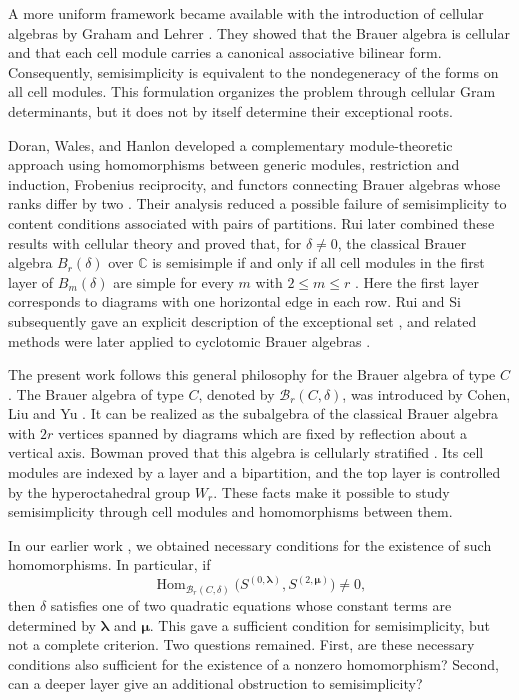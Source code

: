 \documentclass[10pt,a4paper]{amsart}
\DeclareMathOperator {\Hom}{Hom}
\newcommand{\C}{\mathbb{C}}
\newcommand{\1}{\mathfrak{1}}
\newcommand{\B}{\mathcal{B}}
\begin{document}
A more uniform framework became available with the introduction of cellular algebras by Graham and Lehrer \cite{GL96}. They showed that the Brauer algebra is cellular and that each cell module carries a canonical associative bilinear form. Consequently, semisimplicity is equivalent to the nondegeneracy of the forms on all cell modules. This formulation organizes the problem through cellular Gram determinants, but it does not by itself determine their exceptional roots.

Doran, Wales, and Hanlon developed a complementary module-theoretic approach using homomorphisms between generic modules, restriction and induction, Frobenius reciprocity, and functors connecting Brauer algebras whose ranks differ by two \cite{DWH99}. Their analysis reduced a possible failure of semisimplicity to content conditions associated with pairs of partitions. Rui later combined these results with cellular theory and proved that, for $\delta\neq0$, the classical Brauer algebra $B_r(\delta)$ over $\C$ is semisimple if and only if all cell modules in the first layer of $B_m(\delta)$ are simple for every $m$ with $2\leq m\leq r$ \cite{Ru05}. Here the
first layer corresponds to diagrams with one horizontal edge in each row. Rui and Si subsequently gave an explicit description of the exceptional set \cite{RS06}, and related methods were later applied to cyclotomic Brauer algebras \cite{RY04, RX07}.

The present work follows this general philosophy for the Brauer algebra of type $C$. The Brauer algebra of type $C$, denoted by $\B_r(C,\delta)$, was introduced by Cohen, Liu and Yu \cite{CLY12}. It can be realized as the subalgebra of the classical Brauer algebra with $2r$ vertices spanned by diagrams which are fixed by reflection about a vertical axis. Bowman proved that this algebra is cellularly stratified \cite{Bo12}. Its cell modules are indexed by a layer and a bipartition, and the top layer is controlled by the hyperoctahedral group $W_r$. These facts make it possible to study semisimplicity through cell modules and homomorphisms between them.

In our earlier work \cite{KCTprevious}, we obtained necessary
conditions for the existence of such homomorphisms. In
particular, if
$$
 \Hom_{\B_r(C,\delta)}
 \bigl(S^{(0,\bm\lambda)},S^{(2,\bm\mu)}\bigr)\neq 0,
$$
then $\delta$ satisfies one of two quadratic
equations whose constant terms are determined by
$\bm\lambda$ and $\bm\mu$. This gave a sufficient condition
for semisimplicity, but not a complete criterion.
Two questions remained. First, are these necessary conditions
also sufficient for the existence of a nonzero homomorphism?
Second, can a deeper layer give an additional obstruction
to semisimplicity?
\end{document}
